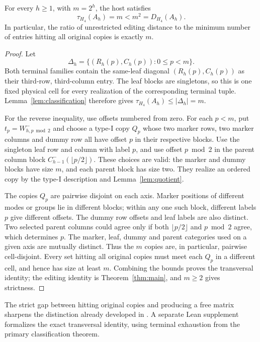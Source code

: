 \begin{corollary}\label{cor:exacttransversal}
For every $h\ge1$, with $m=2^h$, the host satisfies
\[
 \tau_{H_4}(A_h)=m<m^2=D_{H_4}(A_h).
\]
In particular, the ratio of unrestricted editing distance to the
minimum number of entries hitting all original copies is exactly $m$.
\end{corollary}
\begin{proof}
Let
\[
 \Delta_h=\{(R_h(p),C_h(p)):0\le p<m\}.
\]
Both terminal families contain the same-leaf diagonal
$(R_h(p),C_h(p))$ as their third-row, third-column entry.
The leaf blocks are singletons, so this is one fixed physical cell
for every realization of the corresponding terminal tuple.
Lemma~\ref{lem:classification} therefore gives
$\tau_{H_4}(A_h)\le|\Delta_h|=m$.

For the reverse inequality, use offsets numbered from zero. For
each $p<m$, put $t_p=W^-_{h,p\bmod2}$ and choose a type-I copy
$Q_p$ whose two marker rows, two marker columns and dummy row
all have offset $p$ in their respective blocks. Use the singleton
leaf row and column with label $p$, and use offset $p\bmod2$
in the parent column block $C^-_{h-1}(\lfloor p/2\rfloor)$.
These choices are valid: the marker and dummy blocks have size $m$,
and each parent block has size two. They realize an ordered copy
by the type-I description and Lemma~\ref{lem:quotient}.

The copies $Q_p$ are pairwise disjoint on each axis. Marker
positions of different modes or groups lie in different blocks;
within any one such block, different labels $p$ give different
offsets. The dummy row offsets and leaf labels are also distinct.
Two selected parent columns could agree only if both
$\lfloor p/2\rfloor$ and $p\bmod2$ agree, which determines $p$.
The marker, leaf, dummy and parent categories used on a given axis
are mutually distinct. Thus the $m$ copies are, in particular,
pairwise cell-disjoint. Every set hitting all original copies must
meet each $Q_p$ in a different cell, and hence has size at least $m$.
Combining the bounds proves the transversal identity; the editing
identity is Theorem~\ref{thm:main}, and $m\ge2$ gives strictness.
\end{proof}

The strict gap between hitting original copies and producing a free
matrix sharpens the distinction already developed in \cite{OAI}.
A separate Lean supplement formalizes the exact transversal identity,
using terminal exhaustion from the primary classification theorem.
